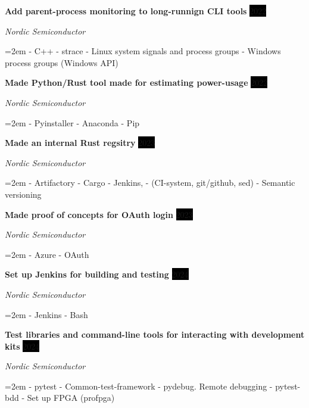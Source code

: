 \documentclass[paper=a4,fontsize=11pt,norsk]{scrartcl} %
\newcommand{\EducationEntry}[4]{
		\noindent \textbf{#1} \hfill      %
		\colorbox{Black}{%
			\parbox{6em}{%
			\hfill\color{White}#2}} \par  %
		\noindent \textit{#3} \par        %
		\noindent\hangindent=2em\hangafter=0 \small #4 %
		\normalsize \par}
\newcommand{\WorkEntry}[4]{				  %
		\noindent \textbf{#1} \hfill      %
		\colorbox{Black}{\color{White}#2} \par  %
		\noindent \textit{#3} \par              %
		\noindent\hangindent=2em\hangafter=0 \small #4 %
		\normalsize \par}
\begin{document}
\WorkEntry{Add parent-process monitoring to long-runnign CLI tools}{2022}{Nordic Semiconductor}
{
- C++
- strace
- Linux system signals and process groups
- Windows process groups (Windows API)
}



\WorkEntry{Made Python/Rust tool made for estimating power-usage}{2022}{Nordic Semiconductor}
{
- Pyinstaller
- Anaconda
- Pip
}


\WorkEntry{Made an internal Rust regsitry}{2023}{Nordic Semiconductor}
{
- Artifactory
- Cargo
- Jenkins,
- (CI-system, git/github, sed)
- Semantic versioning
}


\WorkEntry{Made proof of concepts for OAuth login}{2023}{Nordic Semiconductor}
{
- Azure
- OAuth
}


\WorkEntry{Set up Jenkins for building and testing}{2024}{Nordic Semiconductor}
{
- Jenkins
- Bash
}


\WorkEntry{Test libraries and command-line tools for interacting with development kits}{2024}{Nordic Semiconductor}
{
- pytest
- Common-test-framework
- pydebug. Remote debugging
- pytest-bdd
- Set up FPGA (profpga)
}











\end{document}
